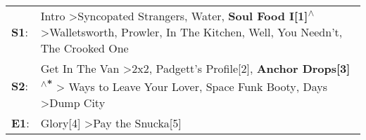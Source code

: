 \begin{supertabular}{p{0.03\textwidth}p{0.92\textwidth}}
 \textbf{S1}:  &  Intro\textsuperscript{} \textgreater \enspace Syncopated Strangers\textsuperscript{}, \enspace Water\textsuperscript{}, \enspace \textbf{Soul Food I[1]\textsuperscript{$\wedge$}} \textgreater \enspace Walletsworth\textsuperscript{}, \enspace Prowler\textsuperscript{}, \enspace In The Kitchen\textsuperscript{}, \enspace Well, You Needn't\textsuperscript{}, \enspace The Crooked One\textsuperscript{}  \enspace  \\
 \textbf{S2}:  &                Get In The Van\textsuperscript{} \textgreater \enspace 2x2\textsuperscript{}, \enspace Padgett's Profile[2]\textsuperscript{}, \enspace \textbf{Anchor Drops[3]\textsuperscript{$\wedge$*}} \textgreater {} Ways to Leave Your Lover\textsuperscript{}, \enspace Space Funk Booty\textsuperscript{},  Days\textsuperscript{} \textgreater \enspace Dump City\textsuperscript{}  \enspace  \\
 \textbf{E1}:  &                                                                                                                                                                                                                                                                                                                              Glory[4]\textsuperscript{} \textgreater \enspace Pay the Snucka[5]\textsuperscript{}  \enspace  \\
\end{supertabular}
